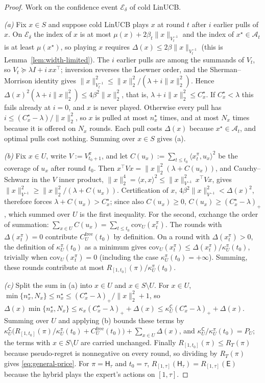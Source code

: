 \documentclass{article}
\theoremstyle{definition}
\theoremstyle{remark}
\theoremstyle{remark}
\newcommand{\Cold}{\mathsf{C}}
\newcommand{\Exp}{\mathsf{E}}
\newcommand{\Hyb}{\mathsf{H}}
\begin{document}
\begin{proof}
Work on the confidence event $\mathcal E_\delta$ of cold LinUCB.

\emph{(a)} Fix $x\in S$ and suppose cold LinUCB plays $x$ at round $t$ after
$i$ earlier pulls of $x$. On $\mathcal E_\delta$ the index of $x$ is at most
$\mu(x)+2\beta_t\|x\|_{V_t^{-1}}$ and the index of $x^\star\in\mathcal A_t$
is at least $\mu(x^\star)$, so playing $x$ requires
$\Delta(x)\le2\beta\|x\|_{V_t^{-1}}$ (this is Lemma~\ref{lem:width-limited}).
The $i$ earlier pulls are among the summands of $V_t$, so
$V_t\succeq\lambda I+i\,xx^\top$; inversion reverses the Loewner order, and
the Sherman--Morrison identity gives
$\|x\|^2_{V_t^{-1}}\le\|x\|_2^2/(\lambda+i\|x\|_2^2)$. Hence
$\Delta(x)^2(\lambda+i\|x\|_2^2)\le4\beta^2\|x\|_2^2$, that is,
$\lambda+i\|x\|_2^2\le C^\star_x$. If $C^\star_x<\lambda$ this fails already at $i=0$, and
$x$ is never played. Otherwise every pull has
$i\le(C^\star_x-\lambda)/\|x\|_2^2$, so $x$ is pulled at most $n^\star_x$ times, and at
most $N_x$ times because it is offered on $N_x$ rounds. Each pull costs
$\Delta(x)$ because $x^\star\in\mathcal A_t$, and optimal pulls cost nothing.
Summing over $x\in S$ gives (a).

\emph{(b)} Fix $x\in U$, write $V:=V^\pi_{t_0+1}$, and let
$C(u_x):=\sum_{t\le t_0}\langle x^\pi_t,u_x\rangle^2$ be the coverage of $u_x$
after round $t_0$. Then $x^\top Vx=\|x\|_2^2(\lambda+C(u_x))$, and
Cauchy--Schwarz in the $V$ inner product,
$\|x\|_2^4=\langle x,x\rangle^2\le\|x\|^2_{V^{-1}}\,x^\top Vx$, gives
$\|x\|^2_{V^{-1}}\ge\|x\|_2^2/(\lambda+C(u_x))$. Certification of $x$,
$4\beta^2\|x\|^2_{V^{-1}}<\Delta(x)^2$, therefore forces
$\lambda+C(u_x)>C^\star_x$; since also $C(u_x)\ge0$, $C(u_x)\ge(C^\star_x-\lambda)_+$,
which summed over $U$ is the first inequality. For the second, exchange the
order of summation: $\sum_{x\in U}C(u_x)=\sum_{t\le t_0}\mathrm{cov}_U(x^\pi_t)$.
The rounds with $\Delta(x^\pi_t)=0$ contribute $C^{\mathrm{free}}_U(t_0)$ by
definition. On a round with $\Delta(x^\pi_t)>0$, the definition of
$\kappa^\pi_U(t_0)$ as a minimum gives
$\mathrm{cov}_U(x^\pi_t)\le\Delta(x^\pi_t)/\kappa^\pi_U(t_0)$, trivially when
$\mathrm{cov}_U(x^\pi_t)=0$ (including the case $\kappa^\pi_U(t_0)=+\infty$).
Summing, these rounds contribute at most $R_{[1,t_0]}(\pi)/\kappa^\pi_U(t_0)$.

\emph{(c)} Split the sum in (a) into $x\in U$ and $x\in S\setminus U$. For
$x\in U$, $\min\{n^\star_x,N_x\}\le n^\star_x\le(C^\star_x-\lambda)_+/\|x\|_2^2+1$, so
$\Delta(x)\min\{n^\star_x,N_x\}\le\kappa_x(C^\star_x-\lambda)_++\Delta(x)\le\kappa^{\Cold}_U(C^\star_x-\lambda)_++\Delta(x)$.
Summing over $U$ and applying (b) bounds these terms by
$\kappa^{\Cold}_U\bigl(R_{[1,t_0]}(\pi)/\kappa^\pi_U(t_0)+C^{\mathrm{free}}_U(t_0)\bigr)+\sum_{x\in U}\Delta(x)$,
and $\kappa^{\Cold}_U/\kappa^\pi_U(t_0)=P_U$; the terms with $x\in S\setminus U$
are carried unchanged. Finally $R_{[1,t_0]}(\pi)\le R_T(\pi)$ because
pseudo-regret is nonnegative on every round, so dividing by $R_T(\pi)$ gives
\eqref{eq:general-price}. For $\pi=\Hyb_\tau$
and $t_0=\tau$, $R_{[1,\tau]}(\Hyb_\tau)=R_{[1,\tau]}(\Exp)$ because the
hybrid plays the expert's actions on $[1,\tau]$.
\end{proof}
\end{document}
